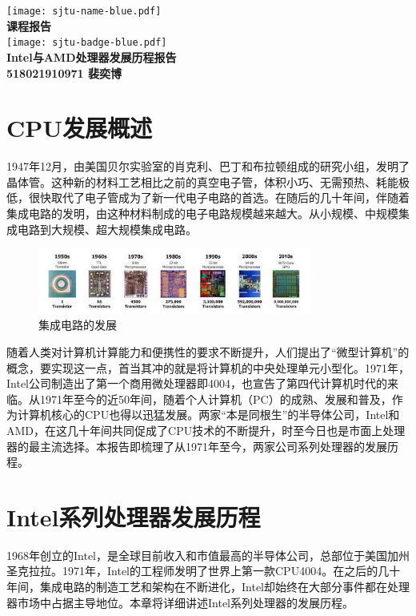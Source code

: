 \documentclass[UTF8]{ctexart}
\begin{document}
\begin{titlepage}
    \begin{center}
        \texttt{[image: sjtu-name-blue.pdf]}\\[1cm]
        \textsc{\Huge \bfseries 课程报告}\\[1.5cm]
        \texttt{[image: sjtu-badge-blue.pdf]}\\[0.5cm]

        \Huge \bfseries{Intel与AMD处理器发展历程报告}\\[1cm]
        \Large \bfseries{518021910971 裴奕博}
    \end{center}
\end{titlepage}

\tableofcontents
\newpage
\section{CPU发展概述}
1947年12月，由美国贝尔实验室的肖克利、巴丁和布拉顿组成的研究小组，发明了晶体管。这种新的材料工艺相比之前的真空电子管，体积小巧、无需预热、耗能极低，很快取代了电子管成为了新一代电子电路的首选。在随后的几十年间，伴随着集成电路的发明，由这种材料制成的电子电路规模越来越大。从小规模、中规模集成电路到大规模、超大规模集成电路。
\begin{figure}[H]
    \begin{center}
        \includegraphics[width=0.8\textwidth]{figure/ICdev.jpg}
        \caption{集成电路的发展}
    \end{center}
\end{figure}

随着人类对计算机计算能力和便携性的要求不断提升，人们提出了“微型计算机”的概念，要实现这一点，首当其冲的就是将计算机的中央处理单元小型化。1971年，Intel公司制造出了第一个商用微处理器即4004，也宣告了第四代计算机时代的来临。从1971年至今的近50年间，随着个人计算机（PC）的成熟、发展和普及，作为计算机核心的CPU也得以迅猛发展。两家“本是同根生”的半导体公司，Intel和AMD，在这几十年间共同促成了CPU技术的不断提升，时至今日也是市面上处理器的最主流选择。本报告即梳理了从1971年至今，两家公司系列处理器的发展历程。
\newpage
\section{Intel系列处理器发展历程}
1968年创立的Intel，是全球目前收入和市值最高的半导体公司，总部位于美国加州圣克拉拉。1971年，Intel的工程师发明了世界上第一款CPU4004。在之后的几十年间，集成电路的制造工艺和架构在不断进化，Intel却始终在大部分事件都在处理器市场中占据主导地位。本章将详细讲述Intel系列处理器的发展历程。
\end{document}
